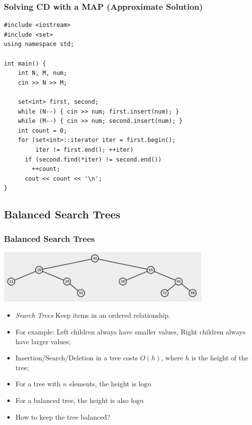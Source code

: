 \begin{frame}[fragile]
  \frametitle{Solving CD with a MAP (Approximate Solution)}

{\smaller
  \begin{block}{}
\begin{verbatim}
#include <iostream>
#include <set>
using namespace std;

int main() {
    int N, M, num;
    cin >> N >> M;

    set<int> first, second;
    while (N--) { cin >> num; first.insert(num); }
    while (M--) { cin >> num; second.insert(num); }
    int count = 0;
    for (set<int>::iterator iter = first.begin();
         iter != first.end(); ++iter)
      if (second.find(*iter) != second.end())
        ++count;
      cout << count << '\n';
}
\end{verbatim}
\end{block}}
\end{frame}



\subsection{Balanced Search Trees}

\begin{frame}
  \frametitle{Balanced Search Trees}
  \begin{center}
    \includegraphics[width=0.8\textwidth]{img/BST}
  \end{center}
  \begin{itemize}
  \item \emph{Search Trees} Keep items in an ordered relationship.
  \item For example: Left children always have smaller values, Right
    children always have larger values;
  \item Insertion/Search/Deletion in a tree costs $O(h)$, where $h$ is
    the height of the tree;
  \item For a tree with $n$ elements, the  height
    is $\text{log}n$
  \item For a balanced tree, the  height is also
    $\text{log}n$
  \item How to keep the tree balanced?
  \end{itemize}
\end{frame}

